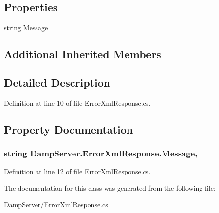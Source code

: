 \subsection*{Properties}
\begin{DoxyCompactItemize}
\item 
string \hyperlink{class_damp_server_1_1_error_xml_response_a024ae10670e273c7ff53629297eb1e97}{Message}
\end{DoxyCompactItemize}
\subsection*{Additional Inherited Members}


\subsection{Detailed Description}


Definition at line 10 of file Error\-Xml\-Response.\-cs.



\subsection{Property Documentation}
\hypertarget{class_damp_server_1_1_error_xml_response_a024ae10670e273c7ff53629297eb1e97}{
\subsubsection[{Message}]{\setlength{\rightskip}{0pt plus 5cm}string Damp\-Server.\-Error\-Xml\-Response.\-Message\hspace{0.3cm}{\ttfamily [get]}, {\ttfamily [set]}}}\label{class_damp_server_1_1_error_xml_response_a024ae10670e273c7ff53629297eb1e97}


Definition at line 12 of file Error\-Xml\-Response.\-cs.



The documentation for this class was generated from the following file\-:\begin{DoxyCompactItemize}
\item 
Damp\-Server/\hyperlink{_error_xml_response_8cs}{Error\-Xml\-Response.\-cs}\end{DoxyCompactItemize}
